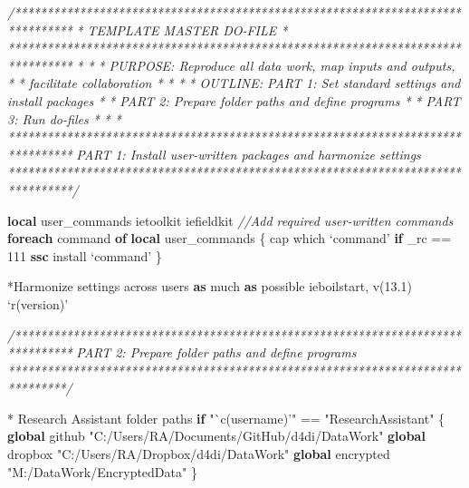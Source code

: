 \documentclass[
]{book}
\newenvironment{Shaded}{\begin{snugshade}}{\end{snugshade}}
\newcommand{\CommentTok}[1]{\textcolor[rgb]{0.56,0.35,0.01}{\textit{#1}}}
\newcommand{\DataTypeTok}[1]{\textcolor[rgb]{0.13,0.29,0.53}{#1}}
\newcommand{\KeywordTok}[1]{\textcolor[rgb]{0.13,0.29,0.53}{\textbf{#1}}}
\newcommand{\NormalTok}[1]{#1}
\newcommand{\OtherTok}[1]{\textcolor[rgb]{0.56,0.35,0.01}{#1}}
\newcommand{\StringTok}[1]{\textcolor[rgb]{0.31,0.60,0.02}{#1}}
\begin{document}
\begin{Shaded}
\begin{Highlighting}[numbers=left,,]
\CommentTok{/*******************************************************************************}
\CommentTok{*                           TEMPLATE MASTER DO-FILE                            *}
\CommentTok{********************************************************************************}
\CommentTok{*                                                                              *}
\CommentTok{*   PURPOSE:     Reproduce all data work, map inputs and outputs,              *}
\CommentTok{*                facilitate collaboration                                      *}
\CommentTok{*                                                                              *}
\CommentTok{*   OUTLINE:     PART 1:  Set standard settings and install packages           *}
\CommentTok{*                PART 2:  Prepare folder paths and define programs             *}
\CommentTok{*                PART 3:  Run do-files                                         *}
\CommentTok{*                                                                              *}
\CommentTok{********************************************************************************}
\CommentTok{  PART 1:  Install user-written packages and harmonize settings}
\CommentTok{********************************************************************************/}

    \KeywordTok{local}\NormalTok{ user_commands ietoolkit iefieldkit }\CommentTok{//Add required user-written commands}
    \KeywordTok{foreach}\NormalTok{ command }\KeywordTok{of} \KeywordTok{local}\NormalTok{ user_commands \{}
\NormalTok{        cap which }\OtherTok{`command'}
        \KeywordTok{if} \DataTypeTok{_rc}\NormalTok{ == 111 }\KeywordTok{ssc}\NormalTok{ install }\OtherTok{`command'}
\NormalTok{    \}}

\NormalTok{    *Harmonize settings across users }\KeywordTok{as}\NormalTok{ much }\KeywordTok{as}\NormalTok{ possible}
\NormalTok{    ieboilstart, v(13.1)}
    \OtherTok{`r(version)'}

\CommentTok{/*******************************************************************************}
\CommentTok{  PART 2:  Prepare folder paths and define programs}
\CommentTok{*******************************************************************************/}

\NormalTok{    * Research Assistant folder paths}
    \KeywordTok{if} \StringTok{"`c(username)'"}\NormalTok{ == }\StringTok{"ResearchAssistant"}\NormalTok{ \{}
        \KeywordTok{global}\NormalTok{ github      }\StringTok{"C:/Users/RA/Documents/GitHub/d4di/DataWork"}
        \KeywordTok{global}\NormalTok{ dropbox     }\StringTok{"C:/Users/RA/Dropbox/d4di/DataWork"}
        \KeywordTok{global}\NormalTok{ encrypted   }\StringTok{"M:/DataWork/EncryptedData"}
\NormalTok{    \}}


\end{Highlighting}
\end{Shaded}
\end{document}
